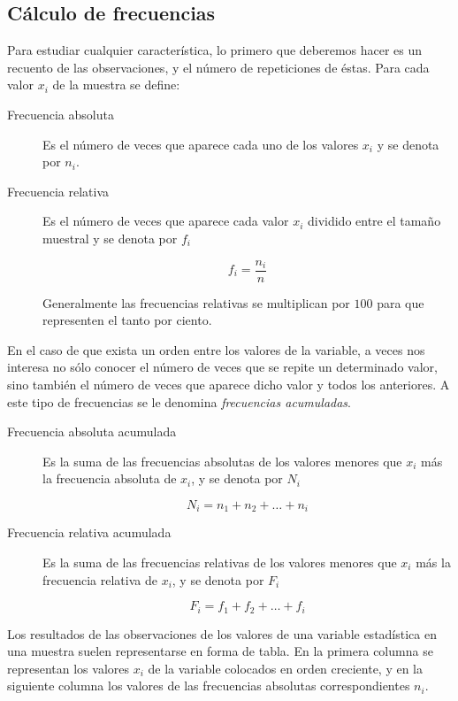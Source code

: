 \subsection{Cálculo de frecuencias}

Para estudiar cualquier característica, lo primero que deberemos hacer es un recuento de las observaciones, y el número de repeticiones de éstas. Para cada valor $x_i$ de la muestra se define:
\begin{description}
\item[Frecuencia absoluta] Es el número de veces que aparece cada uno de los valores $x_i$ y se denota por $n_i$.

\item [Frecuencia relativa] Es el número de veces que aparece cada valor $x_i$ dividido entre el tamaño muestral y se denota por $f_i$

\[f_i=\frac{n_i}{n}\]

Generalmente las frecuencias relativas se multiplican por $100$ para que representen el tanto por ciento.
\end{description}

En el caso de que exista un orden entre los valores de la variable, a veces nos interesa no sólo conocer el número de veces que se repite un determinado valor, sino también el número de veces que aparece dicho valor y todos los anteriores.
A este tipo de frecuencias se le denomina \emph{frecuencias acumuladas}.

\begin{description}
\item [Frecuencia absoluta acumulada] Es la suma de las frecuencias absolutas de los valores menores que $x_i$ más la frecuencia absoluta de $x_i$, y se denota por $N_i$

\[N_i=n_1+n_2+\ldots+n_i\]

\item [Frecuencia relativa acumulada] Es la suma de las frecuencias relativas de los valores menores que $x_i$ más la frecuencia relativa de $x_i$, y se denota por $F_i$

\[F_i=f_1+f_2+\ldots+f_i\]
\end{description}

Los resultados de las observaciones de los valores de una variable estadística en una muestra suelen representarse en forma de tabla.
En la primera columna se representan los valores $x_i$ de la variable colocados en orden creciente, y en la siguiente columna los valores de las frecuencias absolutas correspondientes $n_i$.

